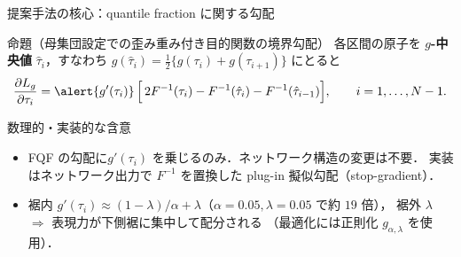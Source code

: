\documentclass[aspectratio=169, 10pt]{beamer}
\newcommand{\blue}[1]{\textcolor{blue!80!black}{#1}}
\providecommand{\Finv}{}\renewcommand{\Finv}{F^{-1}}
\newcommand{\Lg}{L_g}
\begin{document}
\begin{frame}{提案手法の核心：quantile fraction に関する勾配}
  \begin{exampleblock}{命題（母集団設定での歪み重み付き目的関数の境界勾配）}
    各区間の原子を \textbf{$g$-中央値} $\hat\tau_i$，すなわち
    $g(\hat\tau_i)=\tfrac12\{g(\tau_i)+g(\tau_{i+1})\}$ にとると
    \[
      \frac{\partial \Lg}{\partial \tau_i}
      = \alert{g'(\tau_i)}\,\Bigl[\,2\Finv(\tau_i)-\Finv(\hat\tau_i)-\Finv(\hat\tau_{i-1})\Bigr],
      \qquad i=1,\dots,N-1 .
    \]
  \end{exampleblock}
  \begin{block}{数理的・実装的な含意}
    \begin{itemize}
      \item FQF の勾配に\alert{$g'(\tau_i)$ を乗じるのみ}．ネットワーク構造の変更は不要．
            実装はネットワーク出力で $\Finv$ を置換した \blue{plug-in 擬似勾配（stop-gradient）}．
      \item 裾内 $g'(\tau_i)\approx(1-\lambda)/\alpha+\lambda$（$\alpha=0.05,\lambda=0.05$ で約 $19$ 倍），
            裾外 $\lambda$ $\Rightarrow$ 表現力が\blue{下側裾に集中して配分}される
            （最適化には正則化 $g_{\alpha,\lambda}$ を使用）．
    \end{itemize}
  \end{block}
\end{frame}
\end{document}
